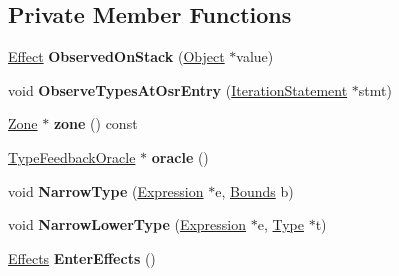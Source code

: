 \subsection*{Private Member Functions}
\begin{DoxyCompactItemize}
\item 
\hyperlink{structv8_1_1internal_1_1_effect}{Effect} {\bfseries Observed\+On\+Stack} (\hyperlink{classv8_1_1internal_1_1_object}{Object} $\ast$value)\hypertarget{classv8_1_1internal_1_1_ast_typer_a7efda1566e22e74f2ea982de00ca8277}{}\label{classv8_1_1internal_1_1_ast_typer_a7efda1566e22e74f2ea982de00ca8277}

\item 
void {\bfseries Observe\+Types\+At\+Osr\+Entry} (\hyperlink{classv8_1_1internal_1_1_iteration_statement}{Iteration\+Statement} $\ast$stmt)\hypertarget{classv8_1_1internal_1_1_ast_typer_a1994f5b19aac3558526e5e37e00d7d63}{}\label{classv8_1_1internal_1_1_ast_typer_a1994f5b19aac3558526e5e37e00d7d63}

\item 
\hyperlink{classv8_1_1internal_1_1_zone}{Zone} $\ast$ {\bfseries zone} () const \hypertarget{classv8_1_1internal_1_1_ast_typer_a14d4b5b1474df1a24e124b9fbad80c39}{}\label{classv8_1_1internal_1_1_ast_typer_a14d4b5b1474df1a24e124b9fbad80c39}

\item 
\hyperlink{classv8_1_1internal_1_1_type_feedback_oracle}{Type\+Feedback\+Oracle} $\ast$ {\bfseries oracle} ()\hypertarget{classv8_1_1internal_1_1_ast_typer_a8942555cddfaae9cd61214f7c6d8c3fb}{}\label{classv8_1_1internal_1_1_ast_typer_a8942555cddfaae9cd61214f7c6d8c3fb}

\item 
void {\bfseries Narrow\+Type} (\hyperlink{classv8_1_1internal_1_1_expression}{Expression} $\ast$e, \hyperlink{structv8_1_1internal_1_1_bounds}{Bounds} b)\hypertarget{classv8_1_1internal_1_1_ast_typer_a0883ec88e9231609c3a271ead25b68d3}{}\label{classv8_1_1internal_1_1_ast_typer_a0883ec88e9231609c3a271ead25b68d3}

\item 
void {\bfseries Narrow\+Lower\+Type} (\hyperlink{classv8_1_1internal_1_1_expression}{Expression} $\ast$e, \hyperlink{classv8_1_1internal_1_1_type}{Type} $\ast$t)\hypertarget{classv8_1_1internal_1_1_ast_typer_a396349c6607725893178074afb41bd76}{}\label{classv8_1_1internal_1_1_ast_typer_a396349c6607725893178074afb41bd76}

\item 
\hyperlink{classv8_1_1internal_1_1_effects}{Effects} {\bfseries Enter\+Effects} ()\hypertarget{classv8_1_1internal_1_1_ast_typer_ada5ed5f2e715f093524fc37c9716a984}{}\label{classv8_1_1internal_1_1_ast_typer_ada5ed5f2e715f093524fc37c9716a984}


\end{DoxyCompactItemize}
